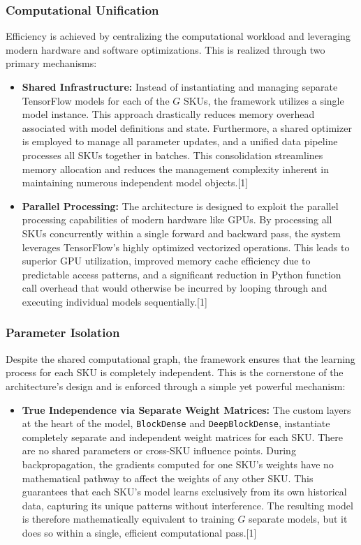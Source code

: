 \documentclass{article}
\begin{document}
\subsubsection{Computational Unification}

Efficiency is achieved by centralizing the computational workload and leveraging modern hardware and software optimizations. This is realized through two primary mechanisms:
\begin{itemize}
    \item \textbf{Shared Infrastructure:} Instead of instantiating and managing separate TensorFlow models for each of the $G$ SKUs, the framework utilizes a single model instance. This approach drastically reduces memory overhead associated with model definitions and state. Furthermore, a shared optimizer is employed to manage all parameter updates, and a unified data pipeline processes all SKUs together in batches. This consolidation streamlines memory allocation and reduces the management complexity inherent in maintaining numerous independent model objects.[1]
    \item \textbf{Parallel Processing:} The architecture is designed to exploit the parallel processing capabilities of modern hardware like GPUs. By processing all SKUs concurrently within a single forward and backward pass, the system leverages TensorFlow's highly optimized vectorized operations. This leads to superior GPU utilization, improved memory cache efficiency due to predictable access patterns, and a significant reduction in Python function call overhead that would otherwise be incurred by looping through and executing individual models sequentially.[1]
\end{itemize}

\subsubsection{Parameter Isolation}

Despite the shared computational graph, the framework ensures that the learning process for each SKU is completely independent. This is the cornerstone of the architecture's design and is enforced through a simple yet powerful mechanism:
\begin{itemize}
    \item \textbf{True Independence via Separate Weight Matrices:} The custom layers at the heart of the model, \texttt{BlockDense} and \texttt{DeepBlockDense}, instantiate completely separate and independent weight matrices for each SKU. There are no shared parameters or cross-SKU influence points. During backpropagation, the gradients computed for one SKU's weights have no mathematical pathway to affect the weights of any other SKU. This guarantees that each SKU's model learns exclusively from its own historical data, capturing its unique patterns without interference. The resulting model is therefore mathematically equivalent to training $G$ separate models, but it does so within a single, efficient computational pass.[1]
\end{itemize}
\end{document}
